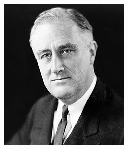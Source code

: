 \begin{frame}
\begin{columns}[c]
\includegraphics[width= \textwidth]{1-3_data_collection_principles/figures/landon_fdr/fdr.png}

\end{columns}

\end{frame}


